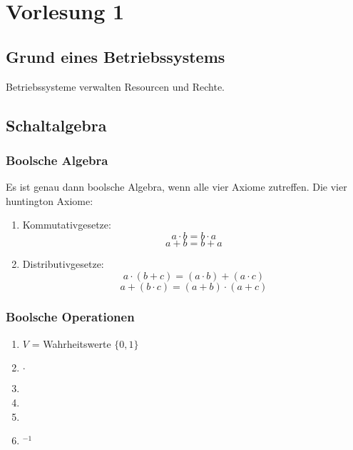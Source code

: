 \documentclass[11pt, a4paper]{article}
\begin{document}
\section{Vorlesung 1}

\subsection{Grund eines Betriebssystems}
Betriebssysteme verwalten Resourcen und Rechte.

\subsection{Schaltalgebra}
\subsubsection{Boolsche Algebra}
Es ist genau dann boolsche Algebra, wenn alle vier Axiome zutreffen.
Die vier huntington Axiome:
\begin{enumerate}
\item Kommutativgesetze: \[a \cdot b = b \cdot a\]\[a+b=b+a\]
\item Distributivgesetze: \[a \cdot (b+c)=(a \cdot b)+(a \cdot c)\]
\[a + (b \cdot c)=(a + b) \cdot (a + c)\]
\end{enumerate}

\subsubsection{Boolsche Operationen}
\begin{enumerate}
\item $V$ = Wahrheitswerte $\{0, 1\}$
\item $\cdot$
\item
\item
\item
\item $^{-1}$
\end{enumerate}
\end{document}
